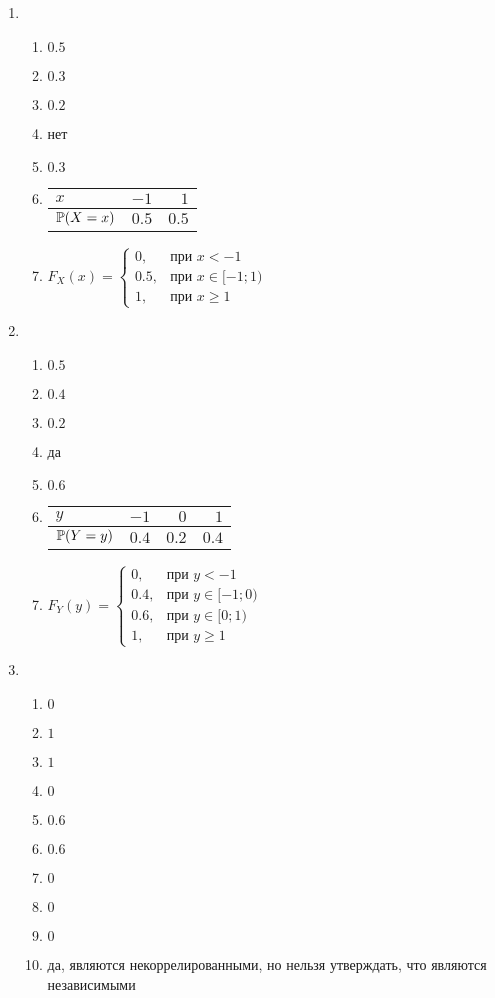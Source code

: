 \begin{multicols}{2}
\begin{enumerate}

\item
\begin{enumerate}
\item   $0.5 $
\item   $0.3$
\item   $0.2$
\item   нет
\item   $0.3$
\item
\begin{tabular}{lrr}
\toprule
$x$ & $-1$  & $1$   \\ \midrule
$\P(X=x)$ & $0.5$ & $0.5$ \\ \bottomrule
\end{tabular}
\item  $F_{X}(x) = \begin{cases}
0, & \text{при } x < -1 \\
0.5 , & \text{при } x \in [-1;1) \\
1, & \text{при }  x \geq 1
\end{cases}$
\end{enumerate}
\item
\begin{enumerate}
\item   $0.5$
\item   $0.4$
\item   $0.2$
\item   да
\item   $0.6$
\item
\begin{tabular}{lrrr}
\toprule
$y$ & $-1$  & $0$   & $1$   \\ \midrule
$\P(Y=y)$ & $0.4$ & $0.2$ & $0.4$ \\ \bottomrule
\end{tabular}
\item   $F_{Y}(y) = \begin{cases}
0, & \text{при } y < -1 \\
0.4 , & \text{при } y \in [-1;0) \\
0.6, & \text{при }  y \in [0;1)\\
1, & \text{при } y \geq 1
\end{cases}$
\end{enumerate}

\item
\begin{enumerate}
\item $0$
\item $1$
\item $1$
\item $0$
\item $0.6$
\item $0.6$
\item $0$
\item $0$
\item $0$
\item да, являются некоррелированными, но нельзя утверждать, что являются независимыми
\end{enumerate}


\end{enumerate}
\end{multicols}
